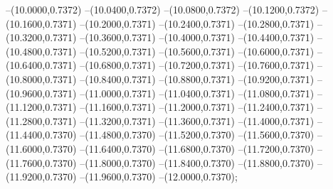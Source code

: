 {	--(10.0000,0.7372)
	--(10.0400,0.7372)
	--(10.0800,0.7372)
	--(10.1200,0.7372)
	--(10.1600,0.7371)
	--(10.2000,0.7371)
	--(10.2400,0.7371)
	--(10.2800,0.7371)
	--(10.3200,0.7371)
	--(10.3600,0.7371)
	--(10.4000,0.7371)
	--(10.4400,0.7371)
	--(10.4800,0.7371)
	--(10.5200,0.7371)
	--(10.5600,0.7371)
	--(10.6000,0.7371)
	--(10.6400,0.7371)
	--(10.6800,0.7371)
	--(10.7200,0.7371)
	--(10.7600,0.7371)
	--(10.8000,0.7371)
	--(10.8400,0.7371)
	--(10.8800,0.7371)
	--(10.9200,0.7371)
	--(10.9600,0.7371)
	--(11.0000,0.7371)
	--(11.0400,0.7371)
	--(11.0800,0.7371)
	--(11.1200,0.7371)
	--(11.1600,0.7371)
	--(11.2000,0.7371)
	--(11.2400,0.7371)
	--(11.2800,0.7371)
	--(11.3200,0.7371)
	--(11.3600,0.7371)
	--(11.4000,0.7371)
	--(11.4400,0.7370)
	--(11.4800,0.7370)
	--(11.5200,0.7370)
	--(11.5600,0.7370)
	--(11.6000,0.7370)
	--(11.6400,0.7370)
	--(11.6800,0.7370)
	--(11.7200,0.7370)
	--(11.7600,0.7370)
	--(11.8000,0.7370)
	--(11.8400,0.7370)
	--(11.8800,0.7370)
	--(11.9200,0.7370)
	--(11.9600,0.7370)
	--(12.0000,0.7370);
}
